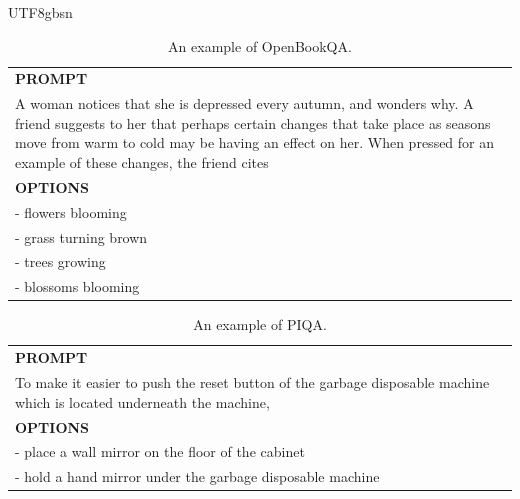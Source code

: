 \documentclass[11pt, a4paper, logo, copyright, nonumbering]{deepseek}
\begin{document}
\begin{CJK*}{UTF8}{gbsn}
\begin{table}[h]
    \centering \small
\begin{tabular}{p{12cm}}
\toprule
\textbf{PROMPT}\\
A woman notices that she is depressed every autumn, and wonders why. A friend suggests to her that perhaps certain changes that take place as seasons move from warm to cold may be having an effect on her. When pressed for an example of these changes, the friend cites\\
\midrule
\textbf{OPTIONS}\\
- flowers blooming\\
- grass turning brown\\
- trees growing\\
- blossoms blooming\\
\bottomrule
\end{tabular}
    \caption{\centering An example of OpenBookQA.}
    \label{tab:openbookqa_eval_format_example}
\end{table}

\begin{table}[h]
    \centering \small
\begin{tabular}{p{12cm}}
\toprule
\textbf{PROMPT}\\
To make it easier to push the reset button of the garbage disposable machine which is located underneath the machine,\\
\midrule
\textbf{OPTIONS}\\
- place a wall mirror on the floor of the cabinet\\
- hold a hand mirror under the garbage disposable machine\\
\bottomrule
\end{tabular}
    \caption{\centering An example of PIQA.}
    \label{tab:PIQA_eval_format_example}
\end{table}


\end{CJK*}
\end{document}
